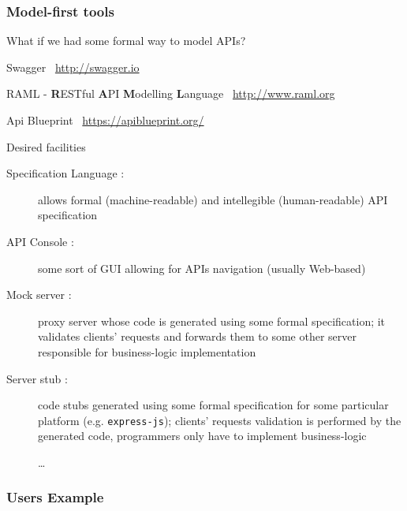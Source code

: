 \begin{frame}[allowframebreaks]
	\frametitle{Model-first tools}
	
	What if we had some formal way to model APIs?
	
	\begin{exampleblock}{Swagger}
		 \swaggerlogo\ \url{http://swagger.io}
	\end{exampleblock}
	
	\begin{exampleblock}{RAML - \textbf{R}ESTful \textbf{A}PI \textbf{M}odelling \textbf{L}anguage}	
		\ramllogo\ \url{http://www.raml.org}
	\end{exampleblock}
	
	\begin{exampleblock}{Api Blueprint}
	 	\blueprintlogo\ \url{https://apiblueprint.org/}
	\end{exampleblock}
	
	\framebreak
	
	\begin{block}{Desired facilities}
		\begin{description}
			\item[Specification Language :] allows formal (machine-readable) and intellegible (human-readable) API specification
			\item[API Console :] some sort of GUI allowing for APIs navigation (usually Web-based)
			\item[Mock server :] proxy server whose code is generated using some formal specification; it validates clients' requests and forwards them to some other server responsible for business-logic implementation
			\item[Server stub :] code stubs generated using some formal specification for some particular platform (e.g. \texttt{express-js}); clients' requests validation is performed by the generated code, programmers only have to implement business-logic
			\item[] \ldots
		\end{description}
	\end{block}
\end{frame}

\subsubsection{Users Example}

